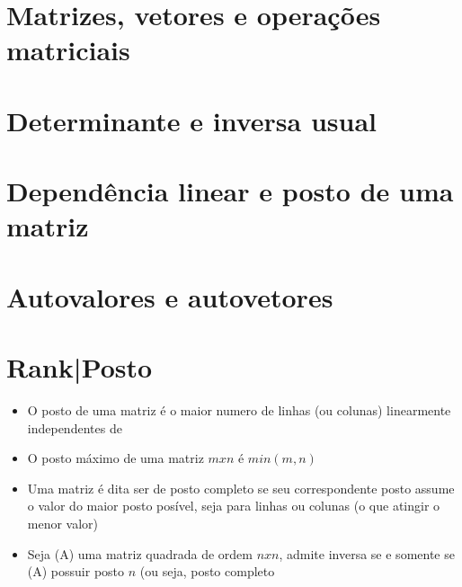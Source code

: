 
\section{Matrizes, vetores e operações matriciais}
\label{sec:matrices_revision}


\section{Determinante e inversa usual}
\label{sec:matrices_inverse}


\section{Dependência linear e posto de uma matriz}
\label{sec:matrices_li_ld}


\section{Autovalores e autovetores}
\label{sec:matrices_eigen}

\section{Rank|Posto}\label{sec:rank}
\begin{itemize}
  \item {O posto de uma matriz  é o maior numero de linhas (ou
    colunas) linearmente independentes de }
  \item {O posto máximo de uma matriz $mxn$ é $min(m, n)$}
  \item {Uma matriz é dita ser de posto completo se seu correspondente posto
    assume o valor do maior posto posível, seja para linhas ou colunas (o que
   atingir o menor valor)}
 \item {Seja \ma(A) uma matriz quadrada de ordem $nxn$,  admite
   inversa se e somente se \ma(A) possuir posto $n$ (ou seja, posto completo}
\end{itemize}


